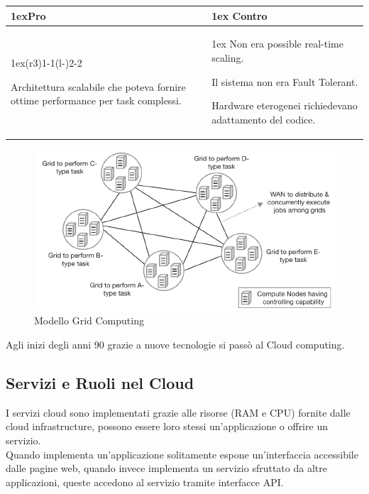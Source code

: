 \documentclass{article}
\begin{document}
\begin{table}[H]
    \begin{tabularx}{\linewidth}{>{\parskip1ex}X@{\kern4\tabcolsep}>{\parskip1ex}X}
    \toprule
    \hfil\bfseries Pro
    &
    \hfil\bfseries Contro
    \\\cmidrule(r{3\tabcolsep}){1-1}\cmidrule(l{-\tabcolsep}){2-2}
    
    Architettura scalabile che poteva fornire ottime performance per task complessi.\par
    &
    Non era possible real-time scaling.\par
    Il sistema non era Fault Tolerant.\par
    Hardware eterogenei richiedevano adattamento del codice.\par
    \\\bottomrule
    \end{tabularx}
\end{table}
\begin{figure}[H]
    \centering
    \includegraphics[scale=1]{img/grid.png}
    \caption{Modello Grid Computing}
\end{figure}
Agli inizi degli anni 90 grazie a nuove tecnologie si passò al Cloud computing.

\subsection{Servizi e Ruoli nel Cloud}
I servizi cloud sono implementati grazie alle risorse (RAM e CPU) fornite dalle cloud infrastructure, possono essere loro stessi un’applicazione o offrire un servizio.\\
Quando implementa un’applicazione solitamente espone un’interfaccia accessibile dalle pagine web, quando invece implementa un servizio sfruttato da altre applicazioni, queste accedono al servizio tramite interfacce API.  
\end{document}
